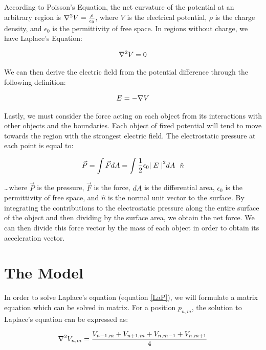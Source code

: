 \documentclass[journal]{IEEEtran}
\begin{document}
According to Poisson's Equation, the net curvature of the potential at an arbitrary region is $\nabla^2V = \frac{\rho}{\epsilon_0}$, where $V$ is the electrical potential, $\rho$ is the charge density, and $\epsilon_0$ is the permittivity of free space.  In regions without charge, we have Laplace's Equation:

\begin{align}
\nabla^2V = 0 \label{LaP}
\end{align}

We can then derive the electric field from the potential difference through the following definition:

\begin{align}
E = -\nabla V \label{delV}
\end{align}

Lastly, we must consider the force acting on each object from its interactions with other objects and the boundaries.  Each object of fixed potential will tend to move towards the region with the strongest electric field.  The electrostatic pressure at each point is equal to:

\begin{align}
\vec{P} = \int\vec{F}dA = \int \frac{1}{2} \epsilon_0 {\norm{E}}^2 dA~\ \hat{n} \label{Pres}
\end{align}

\ldots where $\vec{P}$ is the pressure, $\vec{F}$ is the force, $dA$ is the differential area, $\epsilon_0$ is the permittivity of free space, and $\hat{n}$ is the normal unit vector to the surface.  By integrating the contributions to the electrostatic pressure along the entire surface of the object and then dividing by the surface area, we obtain the net force.  We can then divide this force vector by the mass of each object in order to obtain its acceleration vector.

\section{The Model}

In order to solve Laplace's equation (equation \ref{LaP}), we will formulate a matrix equation which can be solved in matrix.  For a position $p_{n,m}$, the solution to Laplace's equation can be expressed as:

\begin{align}
\nabla^2V_{n,m} = \frac{V_{n-1,m} + V_{n+1,m} + V_{n,m-1} + V_{n,m+1}}{4} \label{discLaP}
\end{align}
\end{document}
